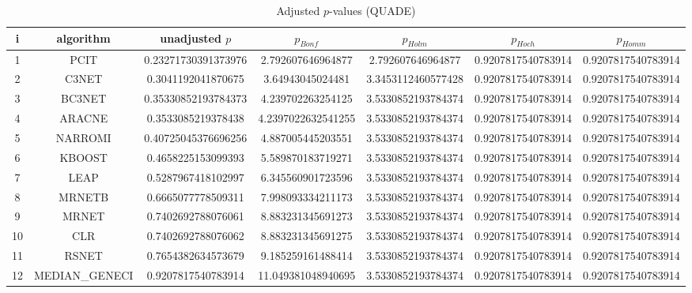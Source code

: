 \documentclass[a4paper,10pt]{article}
\begin{document}
\begin{landscape}
\begin{table}[!htp]
\centering\scriptsize
\caption{Adjusted $p$-values (QUADE)}
\begin{tabular}{ccccccc}
i&algorithm&unadjusted $p$&$p_{Bonf}$&$p_{Holm}$&$p_{Hoch}$&$p_{Homm}$\\
\hline
1&PCIT&0.23271730391373976&2.792607646964877&2.792607646964877&0.9207817540783914&0.9207817540783914\\
2&C3NET&0.3041192041870675&3.64943045024481&3.3453112460577428&0.9207817540783914&0.9207817540783914\\
3&BC3NET&0.35330852193784373&4.239702263254125&3.5330852193784374&0.9207817540783914&0.9207817540783914\\
4&ARACNE&0.3533085219378438&4.2397022632541255&3.5330852193784374&0.9207817540783914&0.9207817540783914\\
5&NARROMI&0.40725045376696256&4.887005445203551&3.5330852193784374&0.9207817540783914&0.9207817540783914\\
6&KBOOST&0.4658225153099393&5.589870183719271&3.5330852193784374&0.9207817540783914&0.9207817540783914\\
7&LEAP&0.5287967418102997&6.345560901723596&3.5330852193784374&0.9207817540783914&0.9207817540783914\\
8&MRNETB&0.6665077778509311&7.998093334211173&3.5330852193784374&0.9207817540783914&0.9207817540783914\\
9&MRNET&0.7402692788076061&8.883231345691273&3.5330852193784374&0.9207817540783914&0.9207817540783914\\
10&CLR&0.7402692788076062&8.883231345691275&3.5330852193784374&0.9207817540783914&0.9207817540783914\\
11&RSNET&0.7654382634573679&9.185259161488414&3.5330852193784374&0.9207817540783914&0.9207817540783914\\
12&MEDIAN_GENECI&0.9207817540783914&11.049381048940695&3.5330852193784374&0.9207817540783914&0.9207817540783914\\
\hline
\end{tabular}
\end{table}


\end{landscape}
\end{document}
